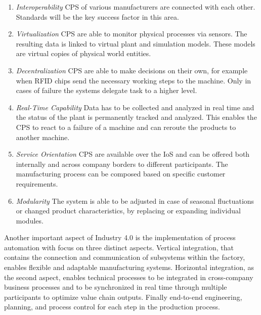 \begin{enumerate}
  \item \textit{Interoperability} \ac{CPS} of various manufacturers are connected with each other. Standards will be the key success factor in this area.\autocite[cf.][p. 11]{Her:2015}
  \item \textit{Virtualization} \ac{CPS} are able to monitor physical processes via sensors. The resulting data is linked to virtual plant and simulation models. These models are virtual copies of physical world entities.\autocite[cf.][p. 11]{Her:2015}
  \item \textit{Decentralization} \ac{CPS} are able to make decisions on their own, for example when \ac{RFID} chips send the necessary working steps to the machine. Only in cases of failure the systems delegate task to a higher level.\autocite[cf.][p. 11]{Her:2015}
  \item \textit{Real-Time Capability} Data has to be collected and analyzed in real time and the status of the plant is permanently tracked and analyzed. This enables the \ac{CPS} to react to a failure of a machine and can reroute the products to another machine.\autocite[cf.][p. 11]{Her:2015}
  \item \textit{Service Orientation} \ac{CPS} are available over the \ac{IoS} and can be offered both internally and across company borders to different participants. The manufacturing process can be composed based on specific customer requirements.\autocite[cf.][p. 11]{Her:2015}
  \item \textit{Modularity} The system is able to be adjusted in case of seasonal fluctuations or changed product characteristics, by replacing or expanding individual modules.\autocite[cf.][p. 11]{Her:2015}
\end{enumerate}

Another important aspect of Industry 4.0 is the implementation of process automation with focus on three distinct aspects.
Vertical integration, that contains the connection and communication of subsystems within the factory, enables flexible and adaptable manufacturing systems.\autocite[cf.][p. 7 ff.]{Vbw:2014}
Horizontal integration, as the second aspect, enables technical processes to be integrated in cross-company business processes and to be synchronized in real time through multiple participants to optimize value chain outputs.\autocite[cf.][p. 7 ff.]{Vbw:2014}
Finally end-to-end engineering, planning, and process control for each step in the production process.\autocite[cf.]{Lyd:2016}

